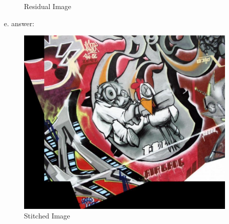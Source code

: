 \documentclass[a4paper, 12pt]{report}
\begin{document}
\begin{itemize}
\begin{figure}[h]
\centering
\caption{Residual Image}
\end{figure}
\item[e.] answer:
\begin{figure}[h]
\includegraphics[scale=.43]{7.png}
\centering
\caption{Stitched Image}
\end{figure}
\end{itemize}
\newpage
\end{document}
